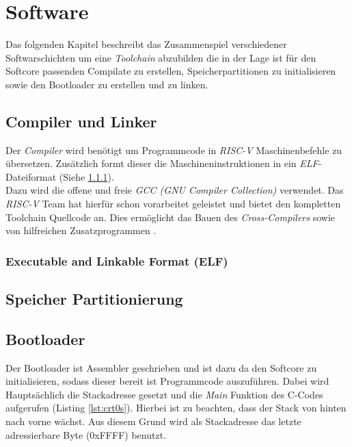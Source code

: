 \chapter{Software}


    Das folgenden Kapitel beschreibt das Zusammenspiel verschiedener Softwarschichten
    um eine \textit{Toolchain} abzubilden die in der Lage ist für den Softcore passenden
    Compilate zu erstellen, Speicherpartitionen zu initialisieren sowie den Bootloader
    zu erstellen und zu linken. 

    \section{Compiler und Linker}

        Der \textit{Compiler} wird benötigt um Programmcode
        in \textit{RISC-V} Maschinenbefehle zu übersetzen.
        Zusätzlich formt dieser die Maschineninstruktionen in ein \textit{ELF}-Dateiformat
        (Siehe \ref{lab:elf}).\\
        Dazu wird die offene und freie
        \textit{GCC (GNU Compiler Collection)} verwendet.
        Das \textit{RISC-V} Team hat hierfür schon vorarbeitet geleistet und bietet
        den kompletten Toolchain Quellcode an.
        Dies ermöglicht das Bauen des \textit{Cross-Compilers} sowie von hilfreichen
        Zusatzprogrammen \cite{riscv-toolchain}.
        
        \subsection{Executable and Linkable Format (ELF)}\label{lab:elf}

    \section{Speicher Partitionierung}


    \section{Bootloader}

        Der Bootloader ist Assembler geschrieben und ist dazu da den
        Softcore zu initialisieren, sodass dieser bereit ist Programmcode auszuführen.
        Dabei wird Hauptsächlich die Stackadresse gesetzt und die \textit{Main}
        Funktion des C-Codes aufgerufen  (Listing \ref{lst:crt0s}).
        Hierbei ist zu beachten, dass der Stack von hinten nach vorne wächst.
        Aus diesem Grund wird als Stackadresse das letzte adressierbare Byte (0xFFFF) benutzt.
        

